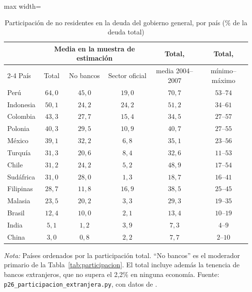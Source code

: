 \begin{table}[htbp]
\centering
\small
\caption[Participación extranjera por país]{Participación de no residentes en la deuda del gobierno general, por país (\% de la deuda total)}
\label{tab:participacion-ranking}
\begin{adjustbox}{max width=\linewidth}
\begin{tabular}{l ccccc}
\toprule
 & \multicolumn{3}{c}{Media en la muestra de estimación} & Total, & Total, \\
\cmidrule(lr){2-4}
País & Total & No bancos & Sector oficial & media 2004--2007 & mínimo--máximo \\
\midrule
Perú & $64{,}0$ & $45{,}0$ & $19{,}0$ & $70{,}7$ & $53$--$74$ \\
Indonesia & $50{,}1$ & $24{,}2$ & $24{,}2$ & $51{,}2$ & $34$--$61$ \\
Colombia & $43{,}3$ & $27{,}7$ & $15{,}4$ & $34{,}5$ & $27$--$57$ \\
Polonia & $40{,}3$ & $29{,}5$ & $10{,}9$ & $40{,}7$ & $27$--$55$ \\
México & $39{,}1$ & $32{,}2$ & $6{,}8$ & $35{,}1$ & $23$--$56$ \\
Turquía & $31{,}3$ & $20{,}6$ & $8{,}4$ & $32{,}6$ & $11$--$53$ \\
Chile & $31{,}2$ & $24{,}2$ & $5{,}2$ & $48{,}9$ & $17$--$54$ \\
Sudáfrica & $31{,}0$ & $28{,}0$ & $1{,}3$ & $18{,}7$ & $16$--$41$ \\
Filipinas & $28{,}7$ & $11{,}8$ & $16{,}9$ & $38{,}5$ & $25$--$45$ \\
Malasia & $23{,}5$ & $20{,}2$ & $3{,}3$ & $29{,}3$ & $19$--$35$ \\
Brasil & $12{,}4$ & $10{,}0$ & $2{,}1$ & $13{,}4$ & $10$--$19$ \\
India & $5{,}1$ & $1{,}2$ & $3{,}9$ & $7{,}3$ & $4$--$9$ \\
China & $3{,}0$ & $0{,}8$ & $2{,}2$ & $7{,}7$ & $2$--$10$ \\
\bottomrule
\end{tabular}
\end{adjustbox}
\par\smallskip\parbox{0.95\linewidth}{\footnotesize \textit{Nota:} Países ordenados por la participación total. ``No bancos'' es el moderador primario de la Tabla~\ref{tab:participacion}. El total incluye además la tenencia de bancos extranjeros, que no supera el 2,2\% en ninguna economía. Fuente: \texttt{p26\_participacion\_extranjera.py}, con datos de \citet{ArslanalpTsuda2014}.}
\end{table}

